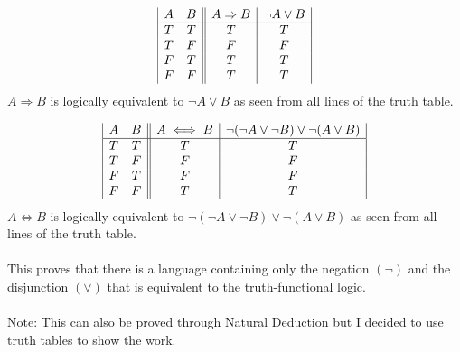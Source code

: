 \documentclass[]{article}
\begin{document}
\begin{enumerate}
    \begin{displaymath}
    \begin{array}{|c c ||c|c|}
    A & B & A \Rightarrow B & \neg A \lor B\\
    \hline
    T & T & T & T\\
    T & F & F & F\\
    F & T & T & T\\
    F & F & T & T\\
    \end{array}
    \end{displaymath}
    \newline $A \Rightarrow B$ is logically equivalent to $\neg A \lor B$ as seen from all lines of the truth table.
    
    \begin{displaymath}
    \begin{array}{|c c ||c|c|}
    A & B & A \iff B & \neg(\neg A \lor \neg B)\lor \neg(A \lor B)\\
    \hline
    T & T & T & T\\
    T & F & F & F\\
    F & T & F & F\\
    F & F & T & T\\
    \end{array}
    \end{displaymath}
    \newline $A \iff B$ is logically equivalent to $\neg(\neg A \lor \neg B)\lor \neg(A \lor B)$ as seen from all lines of the truth table.
    \\\\ This proves that there is a language containing only the negation $(\neg)$ and the disjunction $(\lor)$ that is equivalent to the truth-functional logic.
    \\\\ Note: This can also be proved through Natural Deduction but I decided to use truth tables to show the work.


    
\end{enumerate}
\end{document}
